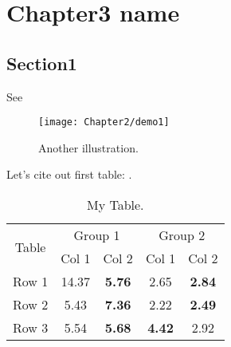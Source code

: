 
\chapter{Chapter3 name} %
\label{ch:doptim_netsys} %




\section{Section1}\label{sec:top_opt_model}

 
See 

\begin{figure}[!htbp]
  \centering
    \texttt{[image: Chapter2/demo1]}
  \caption{Another illustration.}
  \label{fig:demo2}
\end{figure}

Let's cite out first table: .

\begin{table}
	\centering
	\begin{tabular}{ccccc}\toprule
		\multirow{2}{*}{Table}  & \multicolumn{2}{c}{Group 1}   & \multicolumn{2}{c}{Group 2}\\
		& Col 1   &  Col 2 & Col 1   &  Col 2 \\\midrule
		Row 1 & 14.37 & \textbf{5.76} & 2.65 & \textbf{2.84}\\
		Row 2   & 5.43 & \textbf{7.36}     & 2.22 & \textbf{2.49}\\ 
		Row 3 & 5.54 & \textbf{5.68}   & \textbf{4.42} &  2.92\\
		\bottomrule
	\end{tabular}
	\caption{My Table.}
	\label{tab:mytable}
\end{table}

